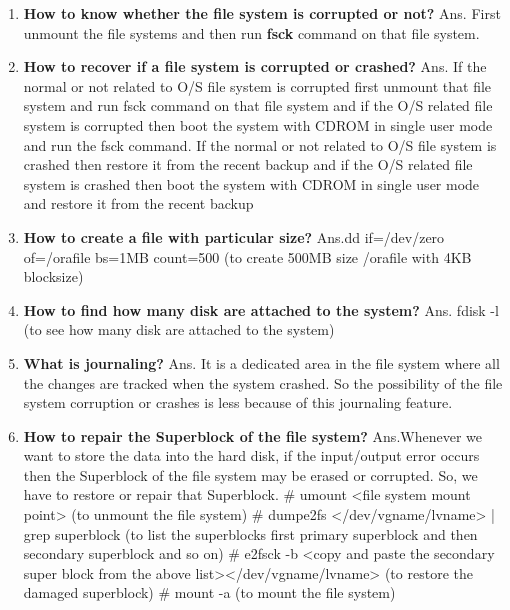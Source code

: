\begin{enumerate}
\begin{enumerate}
  \bigskip
  \bigskip

  \item \textbf{How to know whether the file system is corrupted or not?}
  \newline
  Ans. First unmount the file systems and then run \textbf{fsck }command on that file system.

  \bigskip
  \bigskip

  \item \textbf{How to recover if a file system is corrupted or crashed?}
  \newline
  Ans. If the normal or not related to O/S file system is corrupted first unmount that file system and run fsck command on that file system and if the O/S related file system is corrupted then boot the system with CDROM in single 	user mode and run the fsck command.
  If the normal or not related to O/S file system is crashed then restore it from the recent backup and if the O/S 	related file system is crashed then boot the system with CDROM in single user mode and restore it from the recent backup

  \bigskip
  \bigskip

  \item \textbf{How to create a file with particular size?}
  \newline
   Ans.dd  if=/dev/zero of=/orafile   bs=1MB  count=500 (to create 500MB size  /orafile with 4KB blocksize)

   \bigskip
   \bigskip

  \item \textbf{How to find how many disk are attached to the system?}
  \newline
  Ans. fdisk    -l     (to see how many disk are attached to the system)

  \bigskip
  \bigskip

  \item \textbf{What is journaling?}
  \newline
  Ans. It is a dedicated area in the file system where all the changes are tracked when the system crashed. So the 	possibility of the file system corruption or crashes is less because of this journaling  feature.

  \bigskip
  \bigskip
  
  \item \textbf{How to repair the Superblock of the file system?}
  \newline
  Ans.Whenever we want to store the data into the hard disk, if the input/output error occurs then the Superblock of 	the file system may be erased or corrupted. So, we have to restore or repair that Superblock.
	 # umount    <file system mount point>	(to unmount the file system)
	 # dumpe2fs   </dev/vgname/lvname>  | grep  superblock    (to list the superblocks first primary superblock and  then secondary superblock and so on)
	 # e2fsck   -b   <copy and paste the secondary super block from the above list></dev/vgname/lvname>
			(to restore the damaged superblock)
	 # mount   -a 	(to mount the file system)


\end{enumerate}
\end{enumerate}
